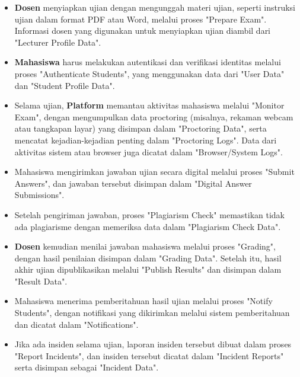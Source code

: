 \begin{itemize}
	\item \textbf{Dosen} menyiapkan ujian dengan mengunggah materi ujian, seperti instruksi ujian dalam format PDF atau Word, melalui proses "Prepare Exam". Informasi dosen yang digunakan untuk menyiapkan ujian diambil dari "Lecturer Profile Data".
	\item \textbf{Mahasiswa} harus melakukan autentikasi dan verifikasi identitas melalui proses "Authenticate Students", yang menggunakan data dari "User Data" dan "Student Profile Data".
	\item Selama ujian, \textbf{Platform} memantau aktivitas mahasiswa melalui "Monitor Exam", dengan mengumpulkan data proctoring (misalnya, rekaman webcam atau tangkapan layar) yang disimpan dalam "Proctoring Data", serta mencatat kejadian-kejadian penting dalam "Proctoring Logs". Data dari aktivitas sistem atau browser juga dicatat dalam "Browser/System Logs".
	\item Mahasiswa mengirimkan jawaban ujian secara digital melalui proses "Submit Answers", dan jawaban tersebut disimpan dalam "Digital Answer Submissions".
	\item Setelah pengiriman jawaban, proses "Plagiarism Check" memastikan tidak ada plagiarisme dengan memeriksa data dalam "Plagiarism Check Data". 
	\item \textbf{Dosen} kemudian menilai jawaban mahasiswa melalui proses "Grading", dengan hasil penilaian disimpan dalam "Grading Data". Setelah itu, hasil akhir ujian dipublikasikan melalui "Publish Results" dan disimpan dalam "Result Data".
	\item Mahasiswa menerima pemberitahuan hasil ujian melalui proses "Notify Students", dengan notifikasi yang dikirimkan melalui sistem pemberitahuan dan dicatat dalam "Notifications".
	\item Jika ada insiden selama ujian, laporan insiden tersebut dibuat dalam proses "Report Incidents", dan insiden tersebut dicatat dalam "Incident Reports" serta disimpan sebagai "Incident Data".
\end{itemize}

